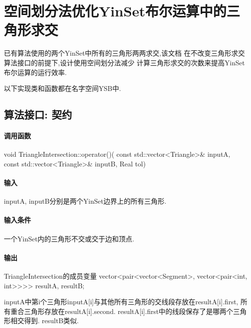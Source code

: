 \documentclass[a4paper]{book}
\makeatletter
\newcommand{\voidenvironment}[1]{%
\expandafter\providecommand\csname env@#1@save@env\endcsname{}%
\expandafter\providecommand\csname env@#1@process\endcsname{}%
\@ifundefined{#1}{}{\RenewEnviron{#1}{}}%
}
\numberwithin{equation}{chapter}
\theoremstyle{definition}
\makeatother
\begin{document}
\pagestyle{empty}




\setcounter{chapter}{0}




\chapter{空间划分法优化YinSet布尔运算中的三角形求交}
已有算法使用的两个YinSet中所有的三角形两两求交,该文档
在不改变三角形求交算法接口的前提下,设计使用空间划分法减少
计算三角形求交的次数来提高YinSet布尔运算的运行效率.

以下实现类和函数都在名字空间YSB中.
\section{算法接口: 契约}
\subsubsection{调用函数}
void TriangleIntersection::operator()(
const std::vector<Triangle>\& inputA,
const std::vector<Triangle>\& inputB,
Real tol)
\subsubsection{输入}
inputA, inputB分别是两个YinSet边界上的所有三角形.
\subsubsection{输入条件}
一个YinSet内的三角形不交或交于边和顶点.
\subsubsection{输出}
TriangleIntersection的成员变量
vector<pair<vector<Segment>,
vector<pair<int, int>\!>\!>\!> resultA, resultB;

inputA中第i个三角形inputA[i]与其他所有三角形的交线段存放在resultA[i].first,
所有重合三角形存放在resultA[i].second.
resultA[i].first中的线段保存了是哪两个三角形相交得到. resultB类似.
\end{document}

